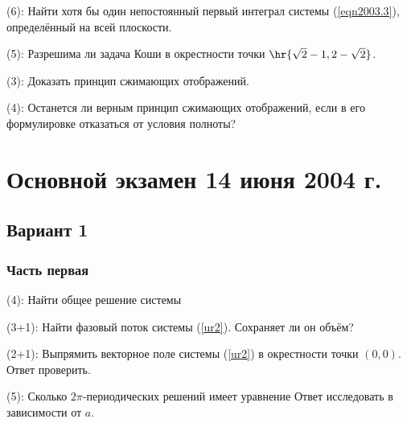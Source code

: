 \documentclass[a4paper]{article}
\newcommand{\skill}[1]{\textsf{(#1):}}
\begin{document}
\begin{problem}
\skill{6}
Найти хотя бы один непостоянный первый интеграл системы (\ref{eqn2003.3}), определённый на всей плоскости.
\end{problem}

\begin{problem}
\skill{5}
Разрешима ли задача Коши
в окрестности точки $\hr{\sqrt2 -1, 2-\sqrt2}$.
\end{problem}

\begin{problem}
\skill{3} Доказать принцип сжимающих отображений.
\end{problem}

\begin{problem}
\skill{4}
Останется ли верным принцип сжимающих отображений, если в его формулировке отказаться от условия полноты?
\end{problem}

\section{Основной экзамен 14 июня 2004 г.}

\subsection{Вариант 1}

\subsubsection{Часть первая}

\begin{problem}
\skill{4} Найти общее решение системы
\end{problem}

\begin{problem}
\skill{3+1} Найти фазовый поток системы (\ref{ur2}). Сохраняет ли он объём?
\end{problem}

\begin{problem}
\skill{2+1} Выпрямить векторное поле системы (\ref{ur2}) в окрестности точки $(0,0)$. Ответ проверить.
\end{problem}

\begin{problem}
\skill{5} Сколько $2\pi$-периодических решений имеет уравнение
Ответ исследовать в зависимости от $a$.
\end{problem}
\end{document}
